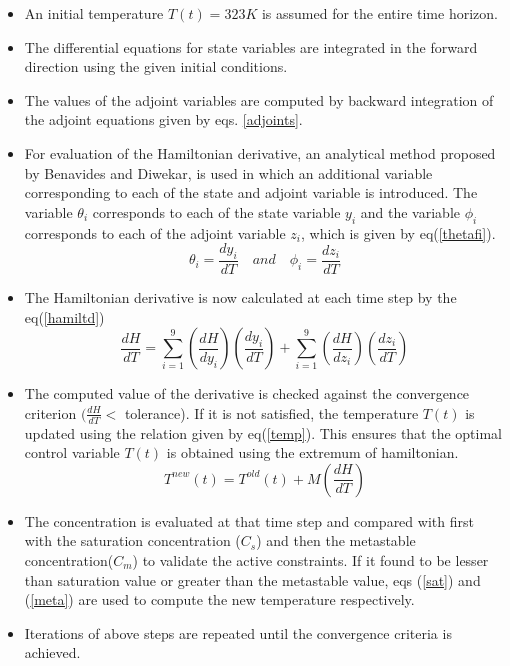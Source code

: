 \documentclass[3p,times]{elsarticle}
\begin{document}
\begin{itemize}
\item An initial temperature $T(t) = 323 K$ is assumed for the entire time horizon.
\item The differential equations for state variables are integrated in the forward direction using the given initial conditions.
\item The values of the adjoint variables are computed by backward integration of the adjoint equations given by eqs. \ref{adjoints}.
\item For evaluation of the Hamiltonian derivative, an analytical method proposed by Benavides and Diwekar\cite{benavides}, is used in which an additional variable corresponding to each of the state and adjoint variable is introduced. The variable $\theta_{i}$ corresponds to each of the state variable $y_{i}$ and the variable $\phi_{i}$ corresponds to each of the adjoint variable $z_{i}$, which is given by eq(\ref{thetafi}).
\begin{equation}
\theta_{i} = \frac{dy_{i}}{dT} \quad and \quad \phi_{i} = \frac{dz_{i}}{dT} \label{thetafi} 
\end{equation}
\item The Hamiltonian derivative is now calculated at each time step by the eq(\ref{hamiltd})
\begin{equation}
\frac{dH}{dT} = \sum_{i=1}^{9} \left( \frac{dH}{dy_{i}}\right)\left(	\frac{dy_{i}}{dT} \right) + \sum_{i=1}^{9} \left(\frac{dH}{dz_{i}}\right)\left(\frac{dz_{i}}{dT} \right) \label{hamiltd}
\end{equation}
\item The  computed value of the derivative is checked against the convergence criterion $(\frac{dH}{dT}<$ tolerance). If it is not satisfied, the temperature $T(t)$ is updated using the relation \cite{yenkie} given by eq(\ref{temp}). This ensures that the optimal control variable $T(t)$ is obtained using the extremum of hamiltonian. 
\begin{equation} 
T^{new}(t) = T^{old}(t) + M\left(\frac{dH}{dT} \right) \label{temp}
\end{equation}
\item The concentration is evaluated  at that time step and compared with first with the saturation concentration ($C_{s}$) and then the metastable concentration($C_{m}$) to validate the active constraints. If it found to be lesser than saturation value or greater than the metastable value, eqs (\ref{sat}) and (\ref{meta}) are used to compute the new temperature respectively. 
\item Iterations of above steps are repeated until the convergence criteria is achieved.
\end{itemize}
\end{document}
